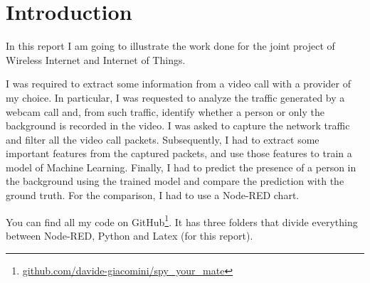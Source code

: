 \section{Introduction}
In this report I am going to illustrate the work done for the joint project of Wireless Internet and Internet of Things.

I was required to extract some information from a video call with a provider of my choice. In particular, I was requested to analyze the traffic generated by a webcam call and, from such traffic, identify whether a person or only the background is recorded in the video. I was asked to capture the network traffic and filter all the video call packets. Subsequently, I had to extract some important features from the captured packets, and use those features to train a model of Machine Learning. Finally, I had to predict the presence of a person in the background using the trained model and compare the prediction with the ground truth. For the comparison, I had to use a Node-RED chart.

You can find all my code on GitHub\footnote{\href{https://github.com/davide-giacomini/spy_your_mate}{github.com/davide-giacomini/spy\_your\_mate}}. It has three folders that divide everything between Node-RED, Python and Latex (for this report).